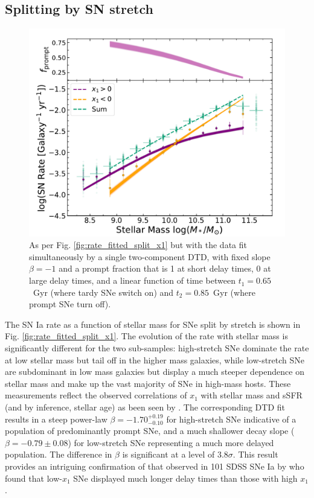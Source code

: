 \documentclass[fleqn,usenatbib]{mnras}
\begin{document}
\subsection{Splitting by SN stretch \label{subsec:split_x1}}

\begin{figure}
    \centering
    \includegraphics[width=.5\textwidth]{figs/rate_vs_mass_DTD_fit_beta_norm_Qerf1.1_split_x1_fitjoint.pdf}
    \caption{As per Fig. \ref{fig:rate_fitted_split_x1} but with the data fit simultaneously by a single two-component DTD, with fixed slope $\beta = -1$ and a prompt fraction that is 1 at short delay times, 0 at large delay times, and a linear function of time between $t_1 =0.65$~Gyr (where tardy SNe switch on) and $t_2=0.85$~Gyr (where prompt SNe turn off).%
    \label{fig:rate_fitted_split_x1_2c_DTD}}
\end{figure}
The SN Ia rate as a function of stellar mass for SNe split by stretch is shown in Fig. \ref{fig:rate_fitted_split_x1}. The evolution of the rate with stellar mass is significantly different for the two sub-samples: high-stretch SNe dominate the rate at low stellar mass but tail off in the higher mass galaxies, while low-stretch SNe are subdominant in low mass galaxies but display a much steeper dependence on stellar mass and make up the vast majority of SNe in high-mass hosts. These measurements reflect the observed correlations of $x_1$ with stellar mass and sSFR (and by inference, stellar age) as been seen by \citet{Rigault2013,Graur2017,Rigault2018,Rose2019,Nicolas2020,Rose2021}. The corresponding DTD fit results in a steep power-law $\beta =-1.70^{+0.19}_{-0.10}$ for high-stretch SNe indicative of a population of predominantly prompt SNe, and a much shallower decay slope ($\beta = -0.79 \pm 0.08$) for low-stretch SNe representing a much more delayed population. The difference in $\beta$ is significant at a level of $3.8\sigma$. This result provides an intriguing confirmation of that observed in 101 SDSS SNe Ia by \citet{Brandt2010} who found that low-$x_1$ SNe displayed much longer delay times than those with high $x_1$.
\end{document}
